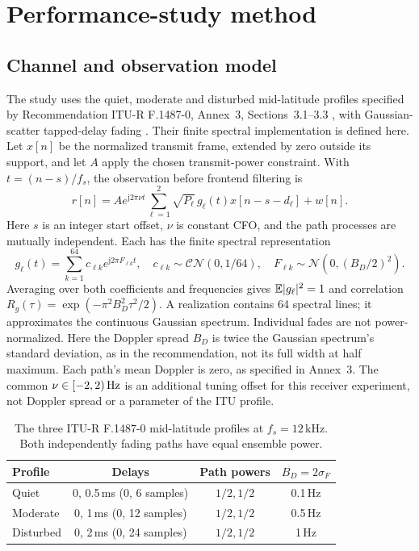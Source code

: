 \section{Performance-study method}
\label{sec:study}

\subsection{Channel and observation model}

The study uses the quiet, moderate and disturbed mid-latitude profiles
specified by Recommendation ITU-R F.1487-0, Annex~3, Sections~3.1--3.3
\cite{itu1487}, with Gaussian-scatter tapped-delay fading
\cite{watterson}. Their finite spectral implementation is defined here. Let
$x[n]$ be the normalized transmit frame, extended by zero outside its
support, and let $A$ apply the chosen transmit-power constraint. With
$t=(n-s)/f_s$, the observation before frontend filtering is
\begin{equation}
 r[n]=A e^{\mathrm j2\pi\nu t}
       \sum_{\ell=1}^{2}\sqrt{P_\ell}\,g_\ell(t)
          x[n-s-d_\ell]+w[n].
 \label{eq:channel}
\end{equation}
Here $s$ is an integer start offset, $\nu$ is constant CFO, and the path
processes are mutually independent. Each has the finite spectral representation
\begin{equation}
 g_\ell(t)=\sum_{k=1}^{64}c_{\ell k}e^{\mathrm j2\pi F_{\ell k}t},\quad
 c_{\ell k}\sim\mathcal{CN}(0,1/64),\quad
 F_{\ell k}\sim\mathcal N(0,(B_D/2)^2).
 \label{eq:fading}
\end{equation}
Averaging over both coefficients and frequencies gives
$\mathbb{E}|g_\ell|^2=1$ and correlation
$R_g(\tau)=\exp(-\pi^2 B_D^2\tau^2/2)$.
A realization contains 64 spectral lines; it approximates the continuous
Gaussian spectrum. Individual fades are not power-normalized.
Here the Doppler spread $B_D$ is twice the Gaussian spectrum's standard
deviation, as in the recommendation, not its full width at half maximum.
Each path's mean Doppler is zero, as specified in Annex~3.
The common $\nu\in[-2,2)\,\mathrm{Hz}$ is an additional tuning offset for this
receiver experiment, not Doppler spread or a parameter of the ITU profile.

\begin{table}[ht]
\centering
\begin{tabular}{@{}lccc@{}}
\toprule
Profile & Delays & Path powers & $B_D=2\sigma_F$ \\
\midrule
Quiet & 0, 0.5\,ms (0, 6 samples) & $1/2,1/2$ & 0.1\,Hz \\
Moderate & 0, 1\,ms (0, 12 samples) & $1/2,1/2$ & 0.5\,Hz \\
Disturbed & 0, 2\,ms (0, 24 samples) & $1/2,1/2$ & 1\,Hz \\
\bottomrule
\end{tabular}
\caption{The three ITU-R F.1487-0 mid-latitude profiles at $f_s=12$\,kHz.
Both independently fading paths have equal ensemble power.}
\label{tab:channel}
\end{table}

